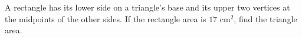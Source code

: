 A rectangle has its lower side on a triangle's base and its upper two vertices at the midpoints of the other sides. If the rectangle area is $ 17\text{ cm}^2 $, find the triangle area.
